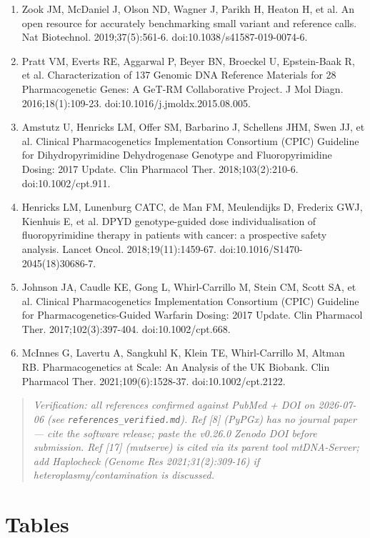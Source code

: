 \documentclass[11pt]{article}
\begin{document}
\begin{enumerate}
\item Zook JM, McDaniel J, Olson ND, Wagner J, Parikh H, Heaton H, et al. An open resource for accurately benchmarking small variant and reference calls. Nat Biotechnol. 2019;37(5):561-6. doi:10.1038/s41587-019-0074-6.
\item Pratt VM, Everts RE, Aggarwal P, Beyer BN, Broeckel U, Epstein-Baak R, et al. Characterization of 137 Genomic DNA Reference Materials for 28 Pharmacogenetic Genes: A GeT-RM Collaborative Project. J Mol Diagn. 2016;18(1):109-23. doi:10.1016/j.jmoldx.2015.08.005.
\item Amstutz U, Henricks LM, Offer SM, Barbarino J, Schellens JHM, Swen JJ, et al. Clinical Pharmacogenetics Implementation Consortium (CPIC) Guideline for Dihydropyrimidine Dehydrogenase Genotype and Fluoropyrimidine Dosing: 2017 Update. Clin Pharmacol Ther. 2018;103(2):210-6. doi:10.1002/cpt.911.
\item Henricks LM, Lunenburg CATC, de Man FM, Meulendijks D, Frederix GWJ, Kienhuis E, et al. DPYD genotype-guided dose individualisation of fluoropyrimidine therapy in patients with cancer: a prospective safety analysis. Lancet Oncol. 2018;19(11):1459-67. doi:10.1016/S1470-2045(18)30686-7.
\item Johnson JA, Caudle KE, Gong L, Whirl-Carrillo M, Stein CM, Scott SA, et al. Clinical Pharmacogenetics Implementation Consortium (CPIC) Guideline for Pharmacogenetics-Guided Warfarin Dosing: 2017 Update. Clin Pharmacol Ther. 2017;102(3):397-404. doi:10.1002/cpt.668.
\item McInnes G, Lavertu A, Sangkuhl K, Klein TE, Whirl-Carrillo M, Altman RB. Pharmacogenetics at Scale: An Analysis of the UK Biobank. Clin Pharmacol Ther. 2021;109(6):1528-37. doi:10.1002/cpt.2122.
\end{enumerate}

\begin{quote}\small\itshape Verification: all references confirmed against PubMed + DOI on 2026-07-06 (see \texttt{references\_verified.md}). Ref [8] (PyPGx) has no journal paper --- cite the software release; paste the v0.26.0 Zenodo DOI before submission. Ref [17] (mutserve) is cited via its parent tool mtDNA-Server; add Haplocheck (Genome Res 2021;31(2):309-16) if heteroplasmy/contamination is discussed.\end{quote}


\section*{Tables}
\end{document}
